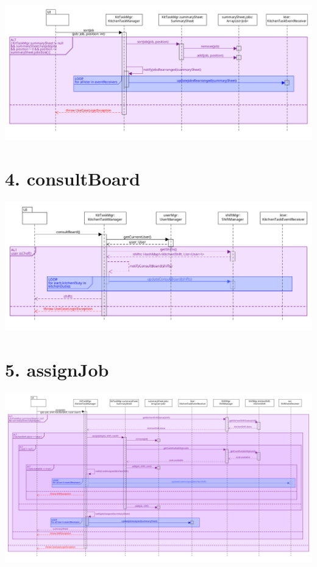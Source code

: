 \begin{center}
  \includegraphics[scale = 0.32]{images/DSD/DSD 3.png}
\end{center}

\pagebreak

\section*{4. consultBoard}

\begin{center}
  \includegraphics[scale = 0.38]{images/DSD/DSD 4.png}
\end{center}

\pagebreak

\section*{5. assignJob}

\begin{center}
  \includegraphics[scale = 0.22]{images/DSD/DSD 5.png}
\end{center}

